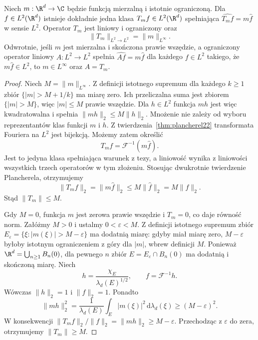 \begin{twierdzenie}[Mnożnik w $L^2$]
\label{thm:dt-multiplier-l2}
Niech $m:\R^d\to\C$ będzie funkcją mierzalną i
istotnie ograniczoną. Dla $f\in L^2(\R^d)$ istnieje
dokładnie jedna klasa $T_mf\in L^2(\R^d)$ spełniająca
$\widehat{T_mf}=m\widehat f$ w sensie $L^2$.
Operator $T_m$ jest liniowy i ograniczony oraz
\[
 \|T_m\|_{L^2\to L^2}=\|m\|_{L^\infty}.
\]
Odwrotnie, jeśli $m$ jest mierzalna i skończona
prawie wszędzie, a ograniczony operator liniowy
$A:L^2\to L^2$ spełnia $\widehat{Af}=m\widehat f$
dla każdego $f\in L^2$ takiego, że
$m\widehat f\in L^2$, to $m\in L^\infty$
oraz $A=T_m$.
\end{twierdzenie}
\begin{proof}
Niech $M=\|m\|_{L^\infty}$. Z definicji istotnego
supremum dla każdego $k\ge1$ zbiór
$\{|m|>M+1/k\}$ ma miarę zero.
Ich przeliczalna suma jest zbiorem $\{|m|>M\}$,
więc $|m|\le M$ prawie wszędzie.
Dla $h\in L^2$ funkcja $mh$ jest więc kwadratowalna
i spełnia $\|mh\|_2\le M\|h\|_2$.
Mnożenie nie zależy od wyboru reprezentantów
klas funkcji $m$ i $h$.
Z twierdzenia~\ref{thm:plancherel22}
transformata Fouriera na $L^2$ jest bijekcją.
Możemy zatem określić
\[
 T_mf=\mathcal F^{-1}(m\widehat f).
\]
Jest to jedyna klasa spełniająca warunek
z tezy, a liniowość wynika z liniowości
wszystkich trzech operatorów w tym złożeniu.
Stosując dwukrotnie twierdzenie Plancherela,
otrzymujemy
\[
 \|T_mf\|_2=\|m\widehat f\|_2
 \le M\|\widehat f\|_2
 =M\|f\|_2.
\]
Stąd $\|T_m\|\le M$.

Gdy $M=0$, funkcja $m$ jest zerowa prawie
wszędzie i $T_m=0$, co daje równość norm.
Załóżmy $M>0$ i ustalmy $0<\varepsilon<M$.
Z definicji istotnego supremum zbiór
$E_\varepsilon=\{\xi:|m(\xi)|>M-\varepsilon\}$
ma dodatnią miarę: gdyby miał miarę zero,
$M-\varepsilon$ byłoby istotnym ograniczeniem
z góry dla $|m|$, wbrew definicji $M$.
Ponieważ $\R^d=\bigcup_{n\ge1}B_n(0)$,
dla pewnego $n$ zbiór
$E=E_\varepsilon\cap B_n(0)$ ma dodatnią
i skończoną miarę. Niech
\[
 h=\frac{\chi_E}{\lambda_d(E)^{1/2}},
 \qquad f=\mathcal F^{-1}h.
\]
Wówczas $\|h\|_2=1$ i
$\|f\|_2=1$. Ponadto
\[
 \|mh\|_2^2
 =\frac1{\lambda_d(E)}\int_E|m(\xi)|^2
 \,\mathrm d\lambda_d(\xi)
 \ge(M-\varepsilon)^2.
\]
W konsekwencji
$\|T_mf\|_2/\|f\|_2=\|mh\|_2\ge M-\varepsilon$.
Przechodząc z $\varepsilon$ do zera,
otrzymujemy $\|T_m\|\ge M$.


\end{proof}

